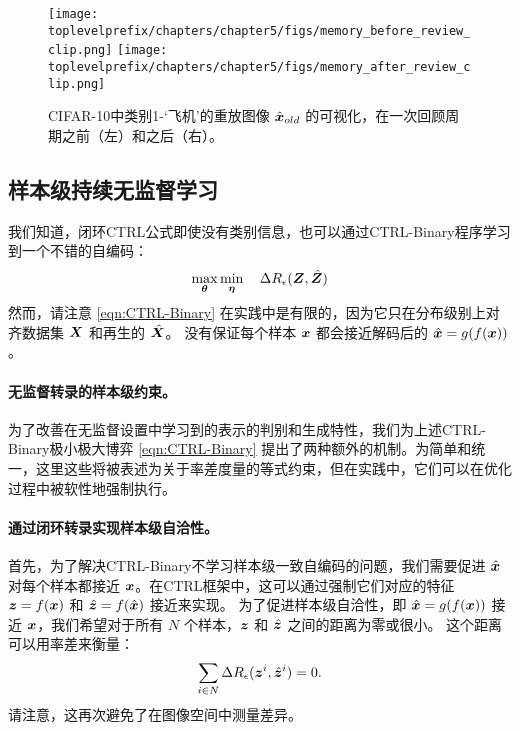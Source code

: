 \documentclass[../../book-main_zh.tex]{subfiles}
\begin{document}
\begin{figure}
\centering
\texttt{[image: \\toplevelprefix/chapters/chapter5/figs/memory\_before\_review\_clip.png]}
\texttt{[image: \\toplevelprefix/chapters/chapter5/figs/memory\_after\_review\_clip.png]}
 \caption{\small CIFAR-10中类别1-‘飞机’的重放图像 $\hat{\bm{x}}_{old}$ 的可视化，在一次回顾周期之前（左）和之后（右）。} 
\label{fig:memory_review}
\end{figure}


\subsection{样本级持续无监督学习}
\label{sec:sample-wise-incremental}

我们知道，闭环CTRL公式即使没有类别信息，也可以通过CTRL-Binary程序学习到一个不错的自编码：
\begin{align}
      \max_{\bm \theta} \min_{\bm \eta} \quad \Delta R_\epsilon(\bm{Z}, \hat{\bm{Z}}) 
 \label{eqn:CTRL-Binary}
\end{align}
然而，请注意 \eqref{eqn:CTRL-Binary} 在实践中是有限的，因为它只在分布级别上对齐数据集 $\bm{X}$ 和再生的 $\hat {\bm{X}}$。
没有保证每个样本 $\bm{x}$ 都会接近解码后的 $\hat {\bm{x}} = g(f(\bm{x}))$。

\paragraph{无监督转录的样本级约束。} 
\label{sec:constraints}
为了改善在无监督设置中学习到的表示的判别和生成特性，我们为上述CTRL-Binary极小极大博弈 \eqref{eqn:CTRL-Binary} 提出了两种额外的机制。为简单和统一，这里这些将被表述为关于率差度量的等式约束，但在实践中，它们可以在优化过程中被软性地强制执行。

\paragraph{通过闭环转录实现样本级自洽性。} 
首先，为了解决CTRL-Binary不学习样本级一致自编码的问题，我们需要促进 $\hat {\bm{x}}$ 对每个样本都接近 $\bm{x}$。在CTRL框架中，这可以通过强制它们对应的特征 $\bm{z}=f(\bm{x})$ 和 $\hat {\bm{z}} = f(\hat {\bm{x}})$ 接近来实现。
为了促进样本级自洽性，即 $\hat{\bm{x}} = g(f(\bm{x}))$ 接近 $\bm{x}$，我们希望对于所有 $N$ 个样本，$\bm{z}$ 和 $\hat{\bm{z}}$ 之间的距离为零或很小。
这个距离可以用率差来衡量：
\begin{align}
\sum_{i\in N} \Delta R_\epsilon(\z^i,\hat{\z}^i) = 0.
\label{eqn:sample-self-consistency}\vspace{-2mm}
\end{align}
请注意，这再次避免了在图像空间中测量差异。
\end{document}
